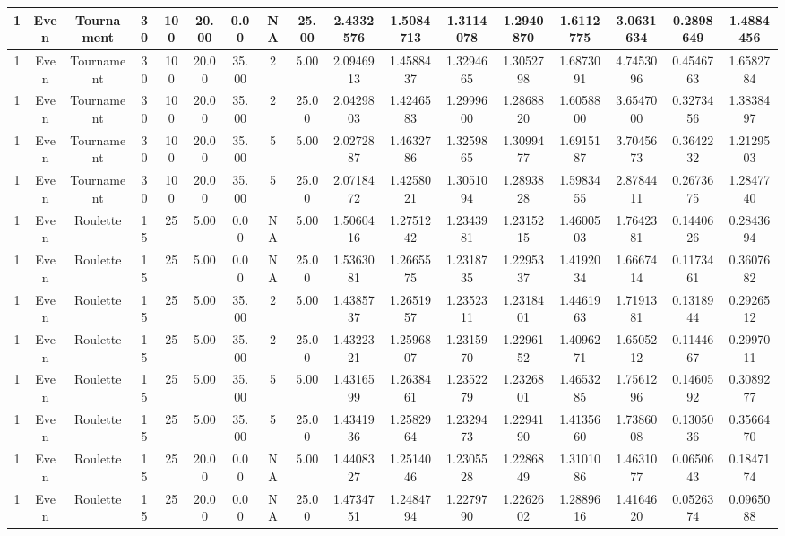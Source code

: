\begin{longtable}{ | c | c | c | c | c | c | c | c | c | c | c | c | c | c | c | c | c | }
	\hline
	1	&	Even	&	Tournament	&	30	&	100	&	20.00	&	0.00	&	NA	&	25.00	&	2.4332576	&	1.5084713	&	1.3114078	&	1.2940870	&	1.6112775	&	3.0631634	&	0.2898649	&	1.4884456 \\
	\hline
	1	&	Even	&	Tournament	&	30	&	100	&	20.00	&	35.00	&	2	&	5.00	&	2.0946913	&	1.4588437	&	1.3294665	&	1.3052798	&	1.6873091	&	4.7453096	&	0.4546763	&	1.6582784 \\
	\hline
	1	&	Even	&	Tournament	&	30	&	100	&	20.00	&	35.00	&	2	&	25.00	&	2.0429803	&	1.4246583	&	1.2999600	&	1.2868820	&	1.6058800	&	3.6547000	&	0.3273456	&	1.3838497 \\
	\hline
	1	&	Even	&	Tournament	&	30	&	100	&	20.00	&	35.00	&	5	&	5.00	&	2.0272887	&	1.4632786	&	1.3259865	&	1.3099477	&	1.6915187	&	3.7045673	&	0.3642232	&	1.2129503 \\
	\hline
	1	&	Even	&	Tournament	&	30	&	100	&	20.00	&	35.00	&	5	&	25.00	&	2.0718472	&	1.4258021	&	1.3051094	&	1.2893828	&	1.5983455	&	2.8784411	&	0.2673675	&	1.2847740 \\
	\hline
	1	&	Even	&	Roulette	&	15	&	25	&	5.00	&	0.00	&	NA	&	5.00	&	1.5060416	&	1.2751242	&	1.2343981	&	1.2315215	&	1.4600503	&	1.7642381	&	0.1440626	&	0.2843694 \\
	\hline
	1	&	Even	&	Roulette	&	15	&	25	&	5.00	&	0.00	&	NA	&	25.00	&	1.5363081	&	1.2665575	&	1.2318735	&	1.2295337	&	1.4192034	&	1.6667414	&	0.1173461	&	0.3607682 \\
	\hline
	1	&	Even	&	Roulette	&	15	&	25	&	5.00	&	35.00	&	2	&	5.00	&	1.4385737	&	1.2651957	&	1.2352311	&	1.2318401	&	1.4461963	&	1.7191381	&	0.1318944	&	0.2926512 \\
	\hline
	1	&	Even	&	Roulette	&	15	&	25	&	5.00	&	35.00	&	2	&	25.00	&	1.4322321	&	1.2596807	&	1.2315970	&	1.2296152	&	1.4096271	&	1.6505212	&	0.1144667	&	0.2997011 \\
	\hline
	1	&	Even	&	Roulette	&	15	&	25	&	5.00	&	35.00	&	5	&	5.00	&	1.4316599	&	1.2638461	&	1.2352279	&	1.2326801	&	1.4653285	&	1.7561296	&	0.1460592	&	0.3089277 \\
	\hline
	1	&	Even	&	Roulette	&	15	&	25	&	5.00	&	35.00	&	5	&	25.00	&	1.4341936	&	1.2582964	&	1.2329473	&	1.2294190	&	1.4135660	&	1.7386008	&	0.1305036	&	0.3566470 \\
	\hline
	1	&	Even	&	Roulette	&	15	&	25	&	20.00	&	0.00	&	NA	&	5.00	&	1.4408327	&	1.2514046	&	1.2305528	&	1.2286849	&	1.3101086	&	1.4631077	&	0.0650643	&	0.1847174 \\
	\hline
	1	&	Even	&	Roulette	&	15	&	25	&	20.00	&	0.00	&	NA	&	25.00	&	1.4734751	&	1.2484794	&	1.2279790	&	1.2262602	&	1.2889616	&	1.4164620	&	0.0526374	&	0.0965088 \\

\end{longtable}
